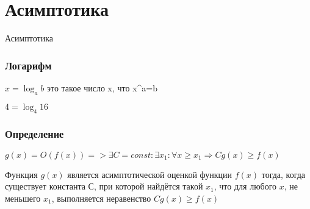 \section{Асимптотика}


\begin{frame}
    \center \Huge Асимптотика
\end{frame}


\begin{frame}
    \frametitle{Логарифм}

    \big 
    $x=\log_a{b}$ это такое число x, что x^a=b

    $4=\log_4{16}$

\end{frame}


\begin{frame}
    \frametitle{Определение}
    \quad $g(x) = O(f(x)) => \exists C = const : \exists x_1:  \forall x\geq x_1 \Rightarrow Cg(x) \geq f(x)$ 

    \quad Функция $g(x)$ является асимптотической оценкой функции $f(x)$ тогда, когда существует константа $С$, при которой найдётся такой $x_1$, что для любого $x$, не меньшего $x_1$, выполняется неравенство $Cg(x) \geq f(x)$

\end{frame}


